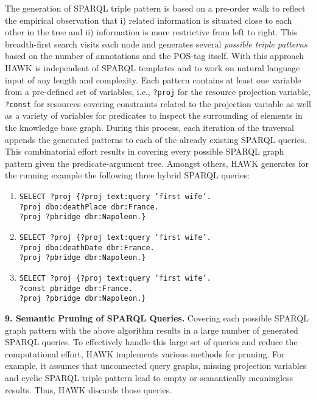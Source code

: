 \documentclass{llncs}
\begin{document}
The generation of SPARQL triple pattern is based on a pre-order walk to reflect the empirical observation that i) related information is situated close to each other in the tree and ii) information is more restrictive from left to right.
This breadth-first search visits each node and generates several \emph{possible triple patterns} based on the number of annotations and the POS-tag itself. 
With this approach HAWK is independent of SPARQL templates and to work on natural language input of any length and complexity.
Each pattern contains at least one variable from a pre-defined set of variables, i.e., \texttt{?proj} for the resource projection variable, \texttt{?const} for resources covering 
constraints related to the projection variable as well as a variety of variables for predicates to inspect the surrounding of elements in the knowledge base graph. 
During this process, each iteration of the traversal appends the generated patterns to each of the already existing SPARQL queries. 
This combinatorial effort results in covering every possible SPARQL graph pattern given the predicate-argument tree.
Amongst others, HAWK generates for the running example the following three hybrid SPARQL queries:
\begin{enumerate}
\item \texttt{SELECT ?proj  \{?proj text:query 'first wife'.\\ ?proj dbo:deathPlace dbr:France.\\ ?proj ?pbridge dbr:Napoleon.\}}
\item \texttt{SELECT ?proj  \{?proj text:query 'first wife'.\\ ?proj dbo:deathDate dbr:France.\\ ?proj ?pbridge dbr:Napoleon.\}}
\item \texttt{SELECT ?proj  \{?proj text:query 'first wife'.\\ ?const pbridge dbr:France.\\ ?proj ?pbridge dbr:Napoleon.\}}
\end{enumerate}

\textbf{9. Semantic Pruning of SPARQL Queries.}
Covering each possible SPARQL graph pattern with the above algorithm results in a large number of generated SPARQL queries.
To effectively handle this large set of queries and reduce the computational effort, HAWK implements various methods for pruning. 
For example, it assumes that unconnected query graphs, missing projection variables and cyclic SPARQL triple pattern lead to empty or semantically meaningless results.
Thus, HAWK discards those queries.
\end{document}
